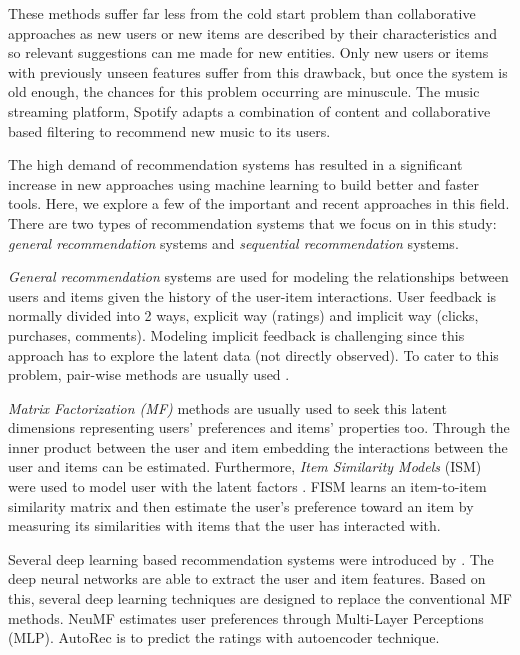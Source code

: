 \documentclass{bioinfo}
\begin{document}
These methods suffer far less from the cold start problem than collaborative approaches as new users or new items are described by their characteristics and so relevant suggestions can me made for new entities. Only new users or items with previously unseen features suffer from this drawback, but once the system is old enough, the chances for this problem occurring are minuscule. The music streaming platform, Spotify adapts a combination of content and collaborative based filtering to recommend new music to its users. 

The high demand of recommendation systems has resulted in a significant increase in new approaches using machine learning to build better and faster tools. Here, we explore a few of the important and recent approaches in this field. There are two types of recommendation systems that we focus on in this study: \textit{general recommendation} systems and \textit{sequential recommendation} systems.

\textit{General recommendation} systems are used for modeling the relationships between users and items given the history of the user-item interactions. User feedback is normally divided into 2 ways, explicit way (ratings) and implicit way (clicks, purchases, comments). Modeling implicit feedback is challenging since this approach has to explore the latent data (not directly observed). To cater to this problem, pair-wise methods are usually used \citep{pairwise}.

\textit{Matrix Factorization (MF)} methods are usually used to seek this latent dimensions representing users' preferences and items' properties too. Through the inner product between the user and item embedding the interactions between the user and items can be estimated. Furthermore, \textit{Item Similarity Models} (ISM) were used to model user with the latent factors \citep{FISM}. FISM learns an item-to-item similarity matrix and then estimate the user's preference toward an item by measuring its similarities with items that the user has interacted with.

Several deep learning based recommendation systems were introduced by \citep{DLRecomSys}. The deep neural networks are able to extract the user and item features. Based on this, several deep learning techniques are designed to replace the conventional MF methods. NeuMF \citep{NeuMF} estimates user preferences through Multi-Layer Perceptions (MLP). AutoRec \citep{AutoRec} is to predict the ratings with autoencoder technique. 
\end{document}
